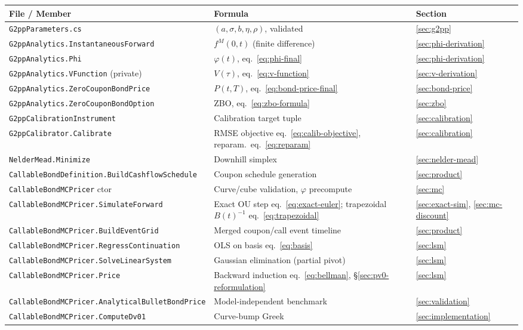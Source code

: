 \documentclass[11pt,a4paper]{article}
\theoremstyle{definition}
\begin{document}
\begin{center}
\small
\renewcommand{\arraystretch}{1.3}
\begin{tabular}{@{}p{5.0cm}p{8.4cm}p{1.7cm}@{}}\toprule
\textbf{File / Member} & \textbf{Formula} & \textbf{Section}\\\midrule
\texttt{G2ppParameters.cs} & $(a,\sigma,b,\eta,\rho)$, validated & \ref{sec:g2pp} \\
\texttt{G2ppAnalytics.InstantaneousForward} & $f^M(0,t)$ (finite difference) & \ref{sec:phi-derivation} \\
\texttt{G2ppAnalytics.Phi} & $\varphi(t)$, eq.~\eqref{eq:phi-final} & \ref{sec:phi-derivation} \\
\texttt{G2ppAnalytics.VFunction} (private) & $V(\tau)$, eq.~\eqref{eq:v-function} & \ref{sec:v-derivation} \\
\texttt{G2ppAnalytics.ZeroCouponBondPrice} & $P(t,T)$, eq.~\eqref{eq:bond-price-final} & \ref{sec:bond-price} \\
\texttt{G2ppAnalytics.ZeroCouponBondOption} & ZBO, eq.~\eqref{eq:zbo-formula} & \ref{sec:zbo} \\
\texttt{G2ppCalibrationInstrument} & Calibration target tuple & \ref{sec:calibration} \\
\texttt{G2ppCalibrator.Calibrate} & RMSE objective eq.~\eqref{eq:calib-objective}, reparam.\ eq.~\eqref{eq:reparam} & \ref{sec:calibration} \\
\texttt{NelderMead.Minimize} & Downhill simplex & \ref{sec:nelder-mead} \\
\texttt{CallableBondDefinition.\allowbreak BuildCashflowSchedule} & Coupon schedule generation & \ref{sec:product} \\
\texttt{CallableBondMCPricer} ctor & Curve/cube validation, $\varphi$ precompute & \ref{sec:mc} \\
\texttt{CallableBondMCPricer.\allowbreak SimulateForward} & Exact OU step eq.~\eqref{eq:exact-euler}; trapezoidal $B(t)^{-1}$ eq.~\eqref{eq:trapezoidal} & \ref{sec:exact-sim}, \ref{sec:mc-discount} \\
\texttt{CallableBondMCPricer.\allowbreak BuildEventGrid} & Merged coupon/call event timeline & \ref{sec:product} \\
\texttt{CallableBondMCPricer.\allowbreak RegressContinuation} & OLS on basis eq.~\eqref{eq:basis} & \ref{sec:lsm} \\
\texttt{CallableBondMCPricer.\allowbreak SolveLinearSystem} & Gaussian elimination (partial pivot) & \ref{sec:lsm} \\
\texttt{CallableBondMCPricer.Price} & Backward induction eq.~\eqref{eq:bellman}, \S\ref{sec:pv0-reformulation} & \ref{sec:lsm} \\
\texttt{CallableBondMCPricer.\allowbreak AnalyticalBulletBondPrice} & Model-independent benchmark & \ref{sec:validation} \\
\texttt{CallableBondMCPricer.\allowbreak ComputeDv01} & Curve-bump Greek & \ref{sec:implementation} \\
\bottomrule
\end{tabular}
\end{center}
\end{document}
